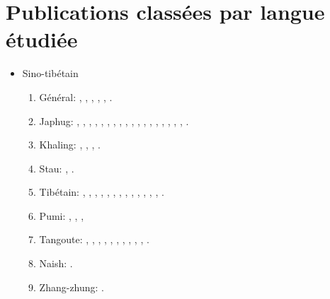 \documentclass[oldfontcommands,oneside,a4paper,11pt]{article}
\newcommand{\langue}[2]{#2}
\begin{document}
\section{\langue{By languages}{Publications classées par langue étudiée}}
\begin{itemize}
\item \langue{Sino-Tibetan}{Sino-tibétain}
\begin{enumerate}
\item \langue{General}{Général}: \citet{jacques03s.houzhui}, \citet{jacques06morpho}, \citet{jacques07chang}, \citet{antonov12kumush}, \citet{jacques12agreement},    \citet{michaud-jacques12nasalite}.     
\item Japhug:  \citet{jacques04redupl},     \citet{jacques04these},   \citet{jacques07passif},  \citet{jacques07redupl}, \citet{jacques08},  \citet{jacques10gesar}, \citet{jacques10refl},  \citet{jacques10inverse},  \citet{jacques12incorp},   \citet{jacques12demotion},  \citet{jacques13harmonization},  \citet{jacques13tropative}, \citet{jacques14antipassive}, \citet{japhug14ideophones}, \citet{jacques14inverse}, \citet{jacques14linking}, \citet{jacques15comparative}, \citet{jacques15causative}, \citet{jacques16relatives}.
\item Khaling: \citet{jacques12khaling},  \citet{jacques13derivational.khaling}, \citet{jacques14auditory}, \citet{jacques15derivational.khaling}.
\item Stau: \citet{antonov14rtau}, \citet{jacques14rtau}.
\item \langue{Tibetan}{Tibétain}:  \citet{jacques01dg}, \citet{jacques04thimphu}, \citet{jacques07naksatram},      \citet{jacques08debther},  \citet{jacques09wazur}, \citet{jacques09e},  \citet{jacques10zos},   \citet{jacques10ndr},  \citet{jacques11lingua},  \citet{jacques12internal},  \citet{jacques12transcription}, \citet{jacques13yod}, \citet{jacques14snom}, \citet{jacques14cone}.
\item Pumi:  \citet{michaud10bonin}, \citet{jacques11pumi.tone}, \citet{jacques11lingua}, 
\item \langue{Tangut}{Tangoute}: \citet{jacques06comparaison},  \citet{jacques07textes}, \citet{jacques08weiyu}, \citet{jacques08alternations},   \citet{jacques09tangutverb},  \citet{jacques10imperial},  \citet{jacques11tangut.verb}, \citet{jacques11ngwemi}, \citet{jacques11kinship},  \citet{jacques14esquisse}, \citet{jacques14ergative}.
\item Naish: \citet{jacques.michaud11naish}.
\item  Zhang-zhung: \citet{jacques09zz}.

\end{enumerate}
\end{itemize}
\end{document}
